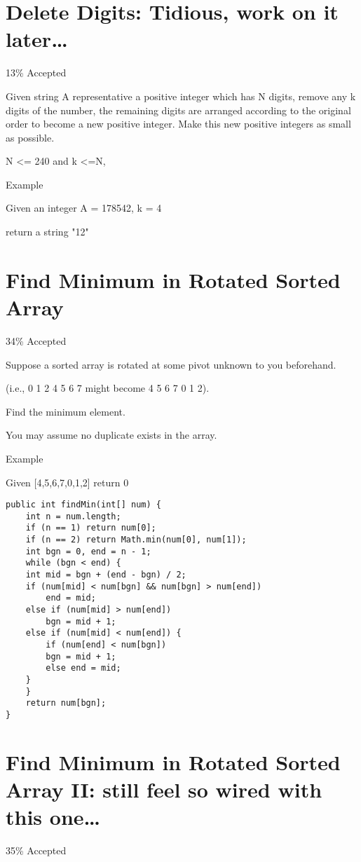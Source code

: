 \documentclass[12pt]{book}
\begin{document}
\chapter{Delete Digits: Tidious, work on it later\ldots{}}
\label{sec-25}

13\% Accepted

Given string A representative a positive integer which has N digits, remove any k digits of the number, the remaining digits are arranged according to the original order to become a new positive integer. Make this new positive integers as small as possible.

N <= 240 and k <=N, 

Example

Given an integer A = 178542, k = 4

return a string "12"
\chapter{Find Minimum in Rotated Sorted Array}
\label{sec-26}

34\% Accepted

Suppose a sorted array is rotated at some pivot unknown to you beforehand.

(i.e., 0 1 2 4 5 6 7 might become 4 5 6 7 0 1 2).

Find the minimum element.

You may assume no duplicate exists in the array.

Example

Given [4,5,6,7,0,1,2] return 0
\lstset{language=java,label= ,caption= ,numbers=none}
\begin{lstlisting}
public int findMin(int[] num) {
    int n = num.length;
    if (n == 1) return num[0];
    if (n == 2) return Math.min(num[0], num[1]);
    int bgn = 0, end = n - 1;
    while (bgn < end) {
	int mid = bgn + (end - bgn) / 2;
	if (num[mid] < num[bgn] && num[bgn] > num[end])
	    end = mid;
	else if (num[mid] > num[end])
	    bgn = mid + 1;
	else if (num[mid] < num[end]) {
	    if (num[end] < num[bgn])
		bgn = mid + 1;
	    else end = mid;
	}  
    }
    return num[bgn];
}
\end{lstlisting}
\chapter{Find Minimum in Rotated Sorted Array II: still feel so wired with this one\ldots{}}
\label{sec-27}

35\% Accepted
\end{document}
